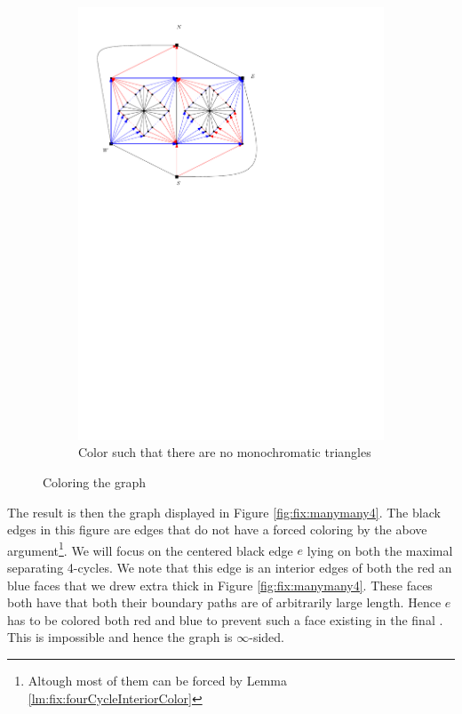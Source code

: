 \begin{figure}[h]
\begin{subfigure}[t]{0.3\textwidth}
      \includegraphics[width=\textwidth]{fixExtension/img/manymany3}
      \caption{Color such that there are no monochromatic triangles}
      \label{fig:fix:manymany3}
    \end{subfigure}
    \caption{Coloring the graph}
    \label{fig:fix:coloring}
  \end{figure}



  The result is then the graph displayed in Figure \ref{fig:fix:manymany4}. The black edges in this figure are edges that do not have a forced coloring by the above argument\footnote{Altough most of them can be forced by Lemma \ref{lm:fix:fourCycleInteriorColor}}.
  We will focus on the centered black edge $e$ lying on both the maximal separating 4-cycles. We note that this edge is an interior edges of both the red an blue faces that we drew extra thick in Figure \ref{fig:fix:manymany4}. These faces both have that both their boundary paths are of arbitrarily large length. Hence $e$ has to be colored both red and blue to prevent such a face existing in the final \rel. This is impossible and hence the graph is $\infty$-sided.

